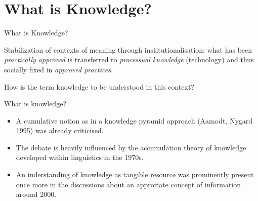 \documentclass{beamer}
\begin{document}
\section{What is Knowledge?}
\begin{frame}{What is Knowledge?}
  
Stabilization of contexts of meaning through institutionalisation: what has
been \emph{practically approved} is transferred to \emph{processual knowledge}
(technology) and thus socially fixed in \emph{approved practices}.

How is the term knowledge to be understood in this context?

What is knowledge?

\begin{itemize}
\item A cumulative notion as in a knowledge pyramid approach (Aamodt, Nygard
  1995) was already criticised.
\item The debate is heavily influenced by the accumulation theory of knowledge
  developed within linguistics in the 1970s.
\item An inderstanding of knowledge as tangible resource was prominently
  present once more in the discussions about an approriate concept of
  information around 2000.
\end{itemize}
\end{frame}
\end{document}
